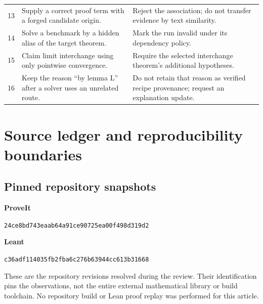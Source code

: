 \documentclass[11pt,a4paper]{article}
\newcommand{\Pcommit}{\texttt{24ce8bd743eaab64a91ce90725ea00f498d319d2}}
\newcommand{\Lcommit}{\texttt{c36adf114035fb2fba6c276b63944cc613b31668}}
\theoremstyle{remark}
\begin{document}
\begin{longtable}{@{}p{}p{}p{}@{}}
13 & Supply a correct proof term with a forged candidate origin. & Reject the association; do not transfer evidence by text similarity.\\
14 & Solve a benchmark by a hidden alias of the target theorem. & Mark the run invalid under its dependency policy.\\
15 & Claim limit interchange using only pointwise convergence. & Require the selected interchange theorem's additional hypotheses.\\
16 & Keep the reason ``by lemma L'' after a solver uses an unrelated route. & Do not retain that reason as verified recipe provenance; request an explanation update.\\
\bottomrule
\end{longtable}

\clearpage
\section{Source ledger and reproducibility boundaries}
\label{app:sources}
\subsection*{Pinned repository snapshots}
\noindent\textbf{ProveIt}\par
\noindent\Pcommit\par
\noindent\textbf{Leant}\par
\noindent\Lcommit

\noindent These are the repository revisions resolved during the review. Their identification pins the observations, not the entire external mathematical library or build toolchain. No repository build or Lean proof replay was performed for this article.
\end{document}
